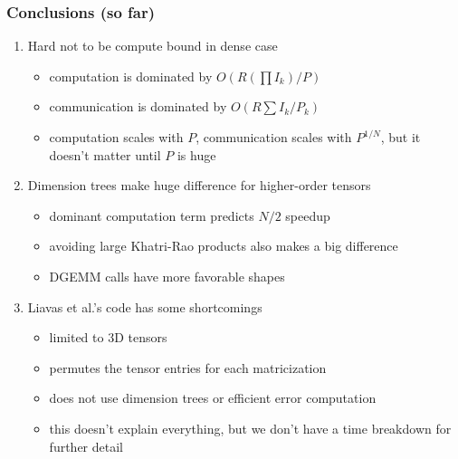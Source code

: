\documentclass[xcolor=dvipsnames]{beamer}
\begin{document}
\begin{frame}
\frametitle{Conclusions (so far)}

\footnotesize
\begin{enumerate}
	\item Hard not to be compute bound in dense case
	\begin{itemize}
	\scriptsize
		\item computation is dominated by $O(R (\prod I_k) / P)$
		\item communication is dominated by $O(R \sum I_k / P_k)$
		\item computation scales with $P$, communication scales with $P^{1/N}$, but it doesn't matter until $P$ is huge
	\end{itemize}
	\vfill
	\item Dimension trees make huge difference for higher-order tensors
	\begin{itemize}
	\scriptsize
		\item dominant computation term predicts $N/2$ speedup
		\item avoiding large Khatri-Rao products also makes a big difference
		\item DGEMM calls have more favorable shapes
	\end{itemize}
	\vfill
	\item Liavas et al.'s code has some shortcomings
	\begin{itemize}
	\scriptsize
		\item limited to 3D tensors
		\item permutes the tensor entries for each matricization 
		\item does not use dimension trees or efficient error computation
		\item this doesn't explain everything, but we don't have a time breakdown for further detail
	\end{itemize}
\end{enumerate}

\end{frame}
\end{document}
